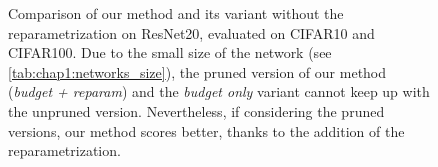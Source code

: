 \begin{figure}
  \centering
  \caption{Comparison of our method and its variant without the
    reparametrization on ResNet20, evaluated on CIFAR10 and CIFAR100. Due to the
    small size of the network (see \cref{tab:chap1:networks_size}), the pruned
    version of our method (\emph{budget + reparam}) and the \emph{budget only}
    variant cannot keep up with the unpruned version. Nevertheless, if considering
    the pruned versions, our method scores better, thanks to the addition of the
    reparametrization.}
  \label{fig:chap1:budget_only_resnet20}
\end{figure}

